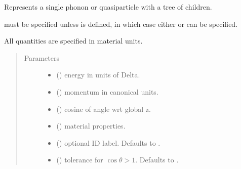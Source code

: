 \documentclass[letterpaper,10pt,english]{sphinxmanual}
\begin{document}
\begin{fulllineitems}
\label{\detokenize{code_structure:scdc.particle.Particle}}
Represents a single phonon or quasiparticle with a tree of children.

 must be specified unless  is defined, in
which case either  or  can be specified.

All quantities are specified in material units.
\begin{quote}\begin{description}
\item[{Parameters}] \leavevmode\begin{itemize}
\item {} 
 (\sphinxstyleliteralemphasis{\sphinxupquote{, }}) \textendash{} energy in units of Delta.

\item {} 
 (\sphinxstyleliteralemphasis{\sphinxupquote{, }}) \textendash{} momentum in canonical units.

\item {} 
 () \textendash{} cosine of angle wrt global z.

\item {} 
 () \textendash{} material properties.

\item {} 
 (\sphinxstyleliteralemphasis{\sphinxupquote{, }}) \textendash{} optional ID label. Defaults to .

\item {} 
 (\sphinxstyleliteralemphasis{\sphinxupquote{, }}) \textendash{} tolerance for \(\cos\theta > 1\).
Defaults to .


\end{itemize}
\end{description}
\end{quote}
\end{fulllineitems}
\end{document}

